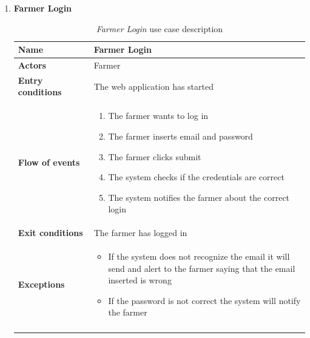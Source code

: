\begin{enumerate}
        \item \textbf{Farmer Login}
        \begin{longtable}{p{0.26\linewidth}p{0.75\linewidth}}
            \toprule
            \textbf{Name} & \textbf{Farmer Login} \\
            \midrule
            \textbf{Actors} & Farmer \\
            \midrule
            \textbf{Entry conditions} & The web application has started\\
            \midrule
            \textbf{Flow of events} & 
            \begin{enumerate}
                \item The farmer wants to log in
                \item The farmer inserts email and password
                \item The farmer clicks submit
                \item The system checks if the credentials are correct
                \item The system notifies the farmer about the correct login
            \end{enumerate} \\
            \midrule
            \textbf{Exit conditions} & The farmer has logged in\\
            \midrule
            \textbf{Exceptions} & 
            \begin{itemize}
                \item If the system does not recognize the email it will send and alert to the farmer saying that the email inserted is wrong
                \item If the password is not correct the system will notify the farmer
            \end{itemize} \\
            \bottomrule
            \caption{\emph{Farmer Login} use case description}
        \end{longtable}
        

\end{enumerate}
